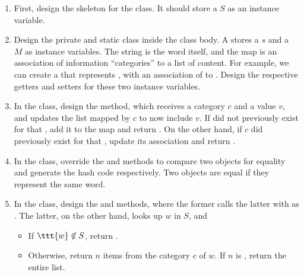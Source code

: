 
\begin{enumerate}[label=(\alph*)]
    \item First, design the skeleton for the  class. It should store a  $S$ as an instance variable.
    \item Design the private and static  class inside the  class body. A  stores a  $s$ and a  $M$ as instance variables. The string is the word itself, and the map is an association of information ``categories'' to a list of content. For example, we can create a  that represents , with an association of  to . Design the respective getters and setters for these two instance variables.
    \item In the  class, design the  method, which receives a category $c$ and a value $v$, and updates the list mapped by $c$ to now include $v$. If  did not previously exist for that , add it to the map and return . On the other hand, if $c$ did previously exist for that , update its association and return .
    \item In the  class, override the  and  methods to compare two  objects for equality and generate the hash code respectively. Two  objects are equal if they represent the same word.
    \item In the  class, design the  and  methods, where the former calls the latter with  as . The latter, on the other hand, looks up $w$ in $S$, and
    \begin{itemize}
        \item If $\ttt{w}\not\in{S}$, return .
        \item Otherwise, return $n$ items from the category $c$ of $w$. If $n$ is , return the entire list.
    \end{itemize}
\end{enumerate}